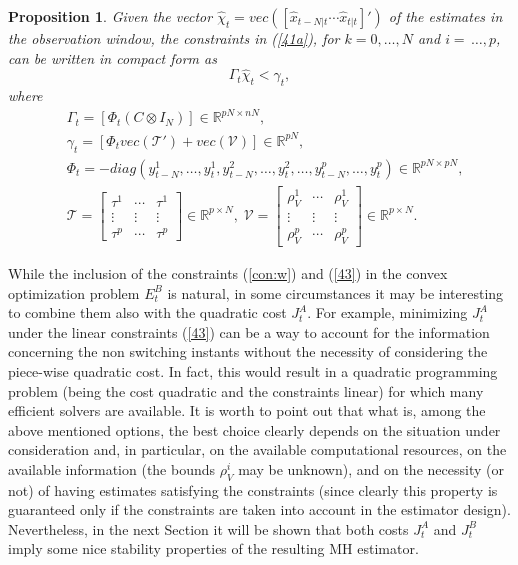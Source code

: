 \documentclass[11pt,journal,onecolumn]{IEEEtran}
\newtheorem{proposition}{Proposition}
\begin{document}
\begin{proposition}
Given the vector $\hat{\chi}_{t}= vec \left ( [ \hat x_{t-N|t} \cdots \hat x_{t|t}  ]' \right )$ of the estimates in the observation window,
the constraints in (\ref{41a}), for $k = 0, \ldots, N$ and $i=\, \ldots, p$, can be written in compact form as
\begin{equation}\label{43}
\Gamma_{t}\hat{\chi}_{t}<\gamma_{t},
\end{equation}
where
\begin{equation}\label{11}
\begin{split}
&\Gamma_{t} = \left[\Phi_{t}(C\otimes I_{N})\right]\in\mathbb{R}^{pN\times nN}, \\
&\gamma_{t} = \left[\Phi_{t}vec(\mathcal{T}')+vec(\mathcal{V})\right]\in\mathbb{R}^{pN}, \\
&\Phi_{t}= -diag(y_{t-N}^{1},\ldots,y_{t}^{1},y_{t-N}^{2},\ldots,y_{t}^{2},\ldots,y_{t-N}^{p},\ldots,y_{t}^{p})\in\mathbb{R}^{pN\times pN}, \\
& \mathcal{T}= \begin{bmatrix} \tau^{1} &  \cdots & \tau^{1} \\
\vdots & \vdots & \vdots \\
\tau^{p} & \cdots & \tau^{p}
\end{bmatrix}\in\mathbb{R}^{p\times N}, \; \mathcal{V}= \begin{bmatrix} \rho_{V}^{1} & \cdots & \rho_{V}^{1} \\
\vdots & \vdots & \vdots \\
\rho_{V}^{p} & \cdots & \rho_{V}^{p} \end{bmatrix}\in\mathbb{R}^{p\times N}.
\end{split}
\end{equation}
\end{proposition}\vspace{.3cm}

While the inclusion of the constraints (\ref{con:w}) and (\ref{43}) in the convex optimization problem $E_{t}^{B}$ is natural, in some circumstances it may be interesting to combine them also with the quadratic cost $J_{t}^{A}$. For example, minimizing $J_{t}^{A}$ under the linear constraints (\ref{43}) can be a way to account for the information concerning the non switching instants without the necessity of considering the piece-wise quadratic cost. In fact, this would result in a quadratic programming problem (being the cost quadratic and the constraints linear) for which many efficient solvers are available. It is worth to point out that what is, among the above mentioned options, the best choice clearly depends on the situation under consideration and, in particular, on the available computational resources, on the available information (the bounds $\rho_{V}^{i}$ may be unknown), and on the necessity (or not) of having estimates satisfying the constraints (since clearly this property is guaranteed only if the constraints are taken into account in the estimator design). Nevertheless, in the next Section it will be shown that both costs $J_t^A$ and $J_t^B$ imply some nice stability properties of the resulting MH estimator.
\end{document}
